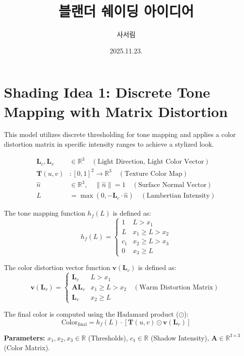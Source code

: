 \documentclass{article}
\title{블랜더 쉐이딩 아이디어}
\author{사서림}
\date{2025.11.23.\text{\_\-\-\_}}
\begin{document}
\maketitle
\newpage


\section*{Shading Idea 1: Discrete Tone Mapping with Matrix Distortion}

This model utilizes discrete thresholding for tone mapping and applies a color distortion matrix in specific intensity ranges to achieve a stylized look.

\[
\begin{aligned}
\mathbf{L}_c, \mathbf{L}_v &\in \mathbb{R}^3 \quad (\text{Light Direction, Light Color Vector}) \\
\mathbf{T}(u,v) &: [0,1]^2 \rightarrow \mathbb{R}^3 \quad (\text{Texture Color Map}) \\
\hat{n} &\in \mathbb{R}^3, \quad \|\hat{n}\|=1 \quad (\text{Surface Normal Vector}) \\
L &= \max(0, -\mathbf{L}_c \cdot \hat{n}) \quad (\text{Lambertian Intensity})
\end{aligned}
\]

The tone mapping function $h_f(L)$ is defined as:
\[
h_f(L) = 
\begin{cases} 
1 & L > x_1 \\
L & x_1 \ge L > x_2 \\
c_1 & x_2 \ge L > x_3 \\
0 & x_3 \ge L 
\end{cases}
\]

The color distortion vector function $\mathbf{v}(\mathbf{L}_v)$ is defined as:
\[
\mathbf{v}(\mathbf{L}_v) = 
\begin{cases} 
\mathbf{L}_v & L > x_1 \\
\mathbf{A} \mathbf{L}_v & x_1 \ge L > x_2 \quad (\text{Warm Distortion Matrix}) \\
\mathbf{L}_v & x_2 \ge L 
\end{cases}
\]

The final color is computed using the Hadamard product ($\odot$):
\[
\text{Color}_{\text{final}} = h_f(L) \cdot [ \mathbf{T}(u,v) \odot \mathbf{v}(\mathbf{L}_v) ]
\]

\noindent \textbf{Parameters:} 
$x_1, x_2, x_3 \in \mathbb{R}$ (Thresholds), $c_1 \in \mathbb{R}$ (Shadow Intensity), $\mathbf{A} \in \mathbb{R}^{3 \times 3}$ (Color Matrix).
\end{document}
